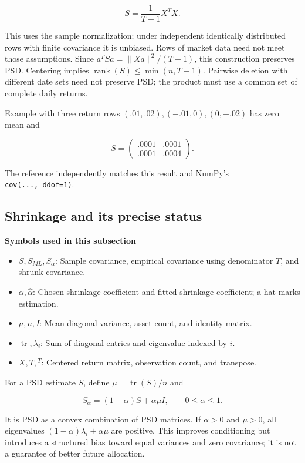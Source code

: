 \documentclass[
  american,
  11pt,
]{article}
\begin{document}
\[S=\frac{1}{T-1}X^TX.\]

This uses the sample normalization; under independent identically
distributed rows with finite covariance it is unbiased. Rows of market
data need not meet those assumptions. Since \(a^TSa=\|Xa\|^2/(T-1)\),
this construction preserves PSD. Centering implies
\(\operatorname{rank}(S)\le\min(n,T-1)\). Pairwise deletion with
different date sets need not preserve PSD; the product must use a common
set of complete daily returns.

Example with three return rows \((.01,.02),(-.01,0),(0,-.02)\) has zero
mean and

\[S=\begin{pmatrix}.0001&.0001\\.0001&.0004\end{pmatrix}.\]

The reference independently matches this result and NumPy's
\texttt{cov(...,\ ddof=1)}.

\subsection{Shrinkage and its precise
status}\label{shrinkage-and-its-precise-status}

\textbf{Symbols used in this subsection}
\begin{itemize}
\item \(S,S_{ML},S_\alpha\): Sample covariance, empirical covariance using denominator $T$, and shrunk covariance.
\item \(\alpha,\hat\alpha\): Chosen shrinkage coefficient and fitted shrinkage coefficient; a hat marks estimation.
\item \(\mu,n,I\): Mean diagonal variance, asset count, and identity matrix.
\item \(\operatorname{tr},\lambda_i\): Sum of diagonal entries and eigenvalue indexed by $i$.
\item \(X,T,{}^T\): Centered return matrix, observation count, and transpose.
\end{itemize}


For a PSD estimate \(S\), define \(\mu=\operatorname{tr}(S)/n\) and

\[S_\alpha=(1-\alpha)S+\alpha\mu I,\qquad 0\le\alpha\le1.\]

It is PSD as a convex combination of PSD matrices. If \(\alpha>0\) and
\(\mu>0\), all eigenvalues \((1-\alpha)\lambda_i+\alpha\mu\) are
positive. This improves conditioning but introduces a structured bias
toward equal variances and zero covariance; it is not a guarantee of
better future allocation.
\end{document}
